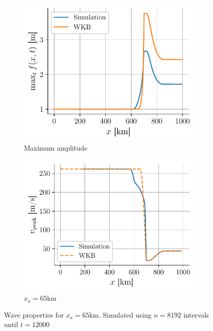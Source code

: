 \begin{figure}[h]
    \centering
    \begin{subfigure}{0.48\linewidth}
        \centering
        \includegraphics[width=\linewidth]{figures/corail_eq1_amplitude_xa=650000.0.pdf}
        \caption{Maximum amplitude}
        \label{fig:corail_eq1_amplitude_xa=65km}
    \end{subfigure}
    \begin{subfigure}{0.48\linewidth}
        \centering
        \includegraphics[width=\linewidth]{figures/corail_eq1_vitesse_xa=650000.0.pdf}
        \caption{\(x_a = 65\)km}
        \label{fig:corail_eq1_speed_xa=65km}
    \end{subfigure}
    \caption{Wave properties for \(x_a = 65\)km. Simulated using \(n=8192\) intervals until \(t=12000\)}
\end{figure}


